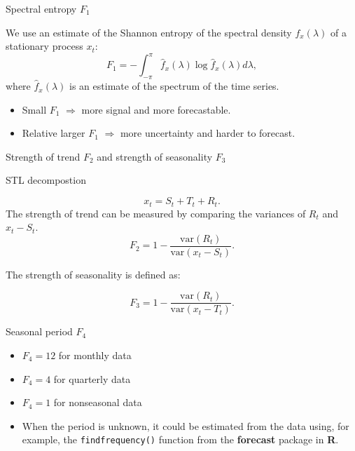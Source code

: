 \documentclass[12pt,ignorenonframetext,compress]{beamer}
\providecommand{\tightlist}{%
\setlength{\itemsep}{0pt}\setlength{\parskip}{0pt}}
\begin{document}
\begin{frame}{Spectral entropy \(F_1\)}

We use an estimate of the Shannon entropy of the spectral density
\(f_x(\lambda)\) of a stationary process \(x_t\): \[
    F_1 = - \int_{-\pi}^{\pi} \hat{f}_x(\lambda) \log \hat{f}_x(\lambda) d\lambda,
\] where \(\hat{f}_x(\lambda)\) is an estimate of the spectrum of the
time series.

\begin{itemize}
\tightlist
\item
  Small \(F_1\) \(\Rightarrow\) more signal and more forecastable.
\item
  Relative larger \(F_1\) \(\Rightarrow\) more uncertainty and harder to
  forecast.
\end{itemize}

\end{frame}

\begin{frame}{Strength of trend \(F_2\) and strength of seasonality
\(F_3\)}

\begin{block}{STL decompostion}

\[ x_t = S_t + T_t + R_t.\] The strength of trend can be measured by
comparing the variances of \(R_t\) and \(x_t - S_t\). \[
    F_2 = 1- \frac{\text{var}(R_t)}{\text{var}(x_t - S_t)}.
\]

The strength of seasonality is defined as:

\[
F_3 = 1- \frac{\text{var}(R_t)}{\text{var}(x_t - T_t)}.
\]

\end{block}

\end{frame}

\begin{frame}[fragile]{Seasonal period \(F_4\)}

\begin{itemize}
\tightlist
\item
  \(F_4=12\) for monthly data
\item
  \(F_4=4\) for quarterly data
\item
  \(F_4=1\) for nonseasonal data
\item
  When the period is unknown, it could be estimated from the data using,
  for example, the \texttt{findfrequency()} function from the
  \textbf{forecast} package in \textbf{R}.
\end{itemize}

\end{frame}
\end{document}

